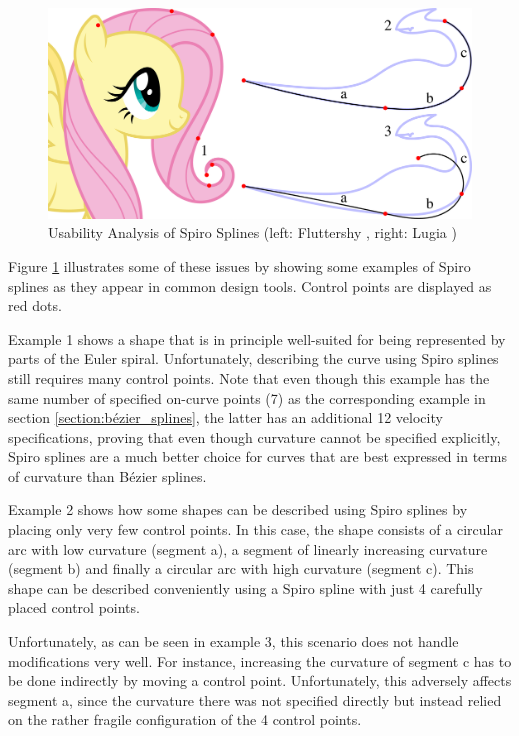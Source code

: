 \documentclass[a4paper]{article}
\begin{document}
				\begin{figure}[htb]
					\centering
					\includegraphics[width=\textwidth]{../resources/usability_spiro.pdf}
					\caption{Usability Analysis of Spiro Splines (left: Fluttershy \cite{fluttershy}, right: Lugia \cite{lugia})}
					\label{figure:usability_spiro}
				\end{figure}

				Figure \ref{figure:usability_spiro} illustrates some of these issues by showing some examples of Spiro splines as they appear in common design tools. Control points are displayed as red dots.

				Example 1 shows a shape that is in principle well-suited for being represented by parts of the Euler spiral. Unfortunately, describing the curve using Spiro splines still requires many control points. Note that even though this example has the same number of specified on-curve points (7) as the corresponding example in section \ref{section:bézier_splines}, the latter has an additional 12 velocity specifications, proving that even though curvature cannot be specified explicitly, Spiro splines are a much better choice for curves that are best expressed in terms of curvature than Bézier splines.

				Example 2 shows how some shapes can be described using Spiro splines by placing only very few control points. In this case, the shape consists of a circular arc with low curvature (segment a), a segment of linearly increasing curvature (segment b) and finally a circular arc with high curvature (segment c). This shape can be described conveniently using a Spiro spline with just 4 carefully placed control points.

				Unfortunately, as can be seen in example 3, this scenario does not handle modifications very well. For instance, increasing the curvature of segment c has to be done indirectly by moving a control point. Unfortunately, this adversely affects segment a, since the curvature there was not specified directly but instead relied on the rather fragile configuration of the 4 control points.
\end{document}
